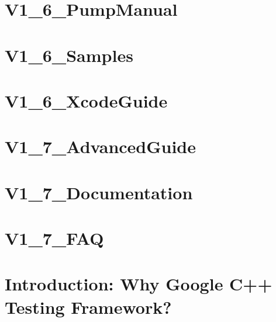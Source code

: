 \documentclass[twoside]{book}
\newcommand{\+}{\discretionary{\mbox{\scriptsize$\hookleftarrow$}}{}{}}
\begin{document}
\chapter{V1\+\_\+6\+\_\+\+Pump\+Manual}
\label{md_vendor_googletest_googletest_docs_V1_6_PumpManual}
\hypertarget{md_vendor_googletest_googletest_docs_V1_6_PumpManual}{}

\chapter{V1\+\_\+6\+\_\+\+Samples}
\label{md_vendor_googletest_googletest_docs_V1_6_Samples}
\hypertarget{md_vendor_googletest_googletest_docs_V1_6_Samples}{}

\chapter{V1\+\_\+6\+\_\+\+Xcode\+Guide}
\label{md_vendor_googletest_googletest_docs_V1_6_XcodeGuide}
\hypertarget{md_vendor_googletest_googletest_docs_V1_6_XcodeGuide}{}

\chapter{V1\+\_\+7\+\_\+\+Advanced\+Guide}
\label{md_vendor_googletest_googletest_docs_V1_7_AdvancedGuide}
\hypertarget{md_vendor_googletest_googletest_docs_V1_7_AdvancedGuide}{}

\chapter{V1\+\_\+7\+\_\+\+Documentation}
\label{md_vendor_googletest_googletest_docs_V1_7_Documentation}
\hypertarget{md_vendor_googletest_googletest_docs_V1_7_Documentation}{}

\chapter{V1\+\_\+7\+\_\+\+F\+AQ}
\label{md_vendor_googletest_googletest_docs_V1_7_FAQ}
\hypertarget{md_vendor_googletest_googletest_docs_V1_7_FAQ}{}

\chapter{Introduction\+: Why Google C++ Testing Framework?}
\label{md_vendor_googletest_googletest_docs_V1_7_Primer}
\hypertarget{md_vendor_googletest_googletest_docs_V1_7_Primer}{}

\end{document}
